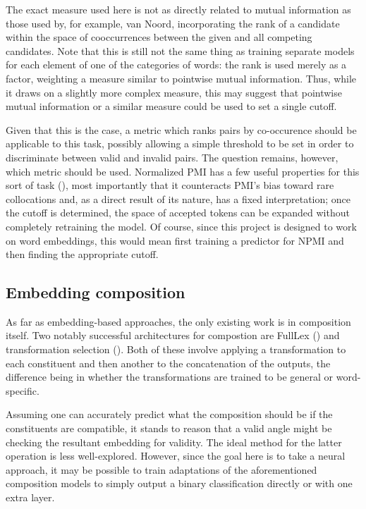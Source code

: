 \documentclass[a4paper, 12pt]{article}
\begin{document}
The exact measure used here is not as directly related to mutual information as those used by, for example, van Noord, incorporating the rank of a candidate within the space of cooccurrences between the given and all competing candidates. Note that this is still not the same thing as training separate models for each element of one of the categories of words: the rank is used merely as a factor, weighting a measure similar to pointwise mutual information. Thus, while it draws on a slightly more complex measure, this may suggest that pointwise mutual information or a similar measure could be used to set a single cutoff.

Given that this is the case, a metric which ranks pairs by co-occurence should be applicable to this task, possibly allowing a simple threshold to be set in order to discriminate between valid and invalid pairs. The question remains, however, which metric should be used. Normalized PMI has a few useful properties for this sort of task (\cite{BoumaNPMI}), most importantly that it counteracts PMI's bias toward rare collocations and, as a direct result of its nature, has a fixed interpretation; once the cutoff is determined, the space of accepted tokens can be expanded without completely retraining the model. Of course, since this project is designed to work on word embeddings, this would mean first training a predictor for NPMI and then finding the appropriate cutoff.

\subsection{Embedding composition}

As far as embedding-based approaches, the only existing work is in composition itself. Two notably successful architectures for compostion are FullLex (\cite{SocherFullLex}) and transformation selection (\cite{TSelect}). Both of these involve applying a transformation to each constituent and then another to the concatenation of the outputs, the difference being in whether the transformations are trained to be general or word-specific.

Assuming one can accurately predict what the composition should be if the constituents are compatible, it stands to reason that a valid angle might be checking the resultant embedding for validity. The ideal method for the latter operation is less well-explored. However, since the goal here is to take a neural approach, it may be possible to train adaptations of the aforementioned composition models to simply output a binary classification directly or with one extra layer.
\end{document}
